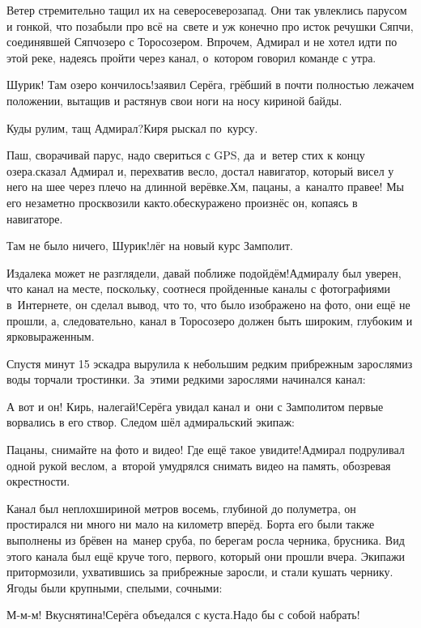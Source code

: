 Ветер стремительно тащил их на северо\sdash северо\sdash запад. Они так увлеклись парусом и гонкой, что позабыли про всё на~свете и уж конечно про исток речушки Сяпчи, соединявшей Сяпчозеро с Торосозером. Впрочем, Адмирал и не хотел идти по этой реке, надеясь пройти через канал, о~котором говорил команде с утра.

\diagdash Шурик! Там озеро кончилось!\mdash заявил Серёга, грёбший в почти полностью лежачем положении, вытащив и растянув свои ноги на носу кириной байды.

\diagdash Куды рулим, тащ Адмирал?\mdash Киря рыскал по~курсу.

\diagdash Паш, сворачивай парус, надо свериться с GPS, да~и~ветер стих к концу озера.\mdash сказал Адмирал и, перехватив весло, достал навигатор, который висел у него на шее через плечо на длинной верёвке.\mdash Хм, пацаны, а~канал\sdash то правее! Мы его незаметно просквозили как\sdash то.\mdash обескуражено произнёс он, копаясь в навигаторе.

\diagdash Там не было ничего, Шурик!\mdash лёг на новый курс Замполит.

\diagdash Издалека может не разглядели, давай поближе подойдём!\mdash Адмиралу был уверен, что канал на месте, поскольку, соотнеся пройденные каналы с фотографиями в~Интернете, он сделал вывод, что то, что было изображено на фото, они ещё не прошли, а, следовательно, канал в Торосозеро должен быть широким, глубоким и ярковыраженным. 

Спустя минут 15 эскадра вырулила к небольшим редким прибрежным зарослям\mdash из воды торчали тростинки. За~этими редкими зарослями начинался канал:

\diagdash А вот и он! Кирь, налегай!\mdash Серёга увидал канал и~они с Замполитом первые ворвались в его створ. Следом шёл адмиральский экипаж:

\diagdash Пацаны, снимайте на фото и видео! Где ещё такое увидите!\mdash Адмирал подруливал одной рукой веслом, а~второй умудрялся снимать видео на память, обозревая окрестности.

Канал был неплох\mdash шириной метров восемь, глубиной до полуметра, он простирался ни много ни мало на километр вперёд. Борта его были также выполнены из брёвен на~манер сруба, по берегам росла черника, брусника. Вид этого канала был ещё круче того, первого, который они прошли вчера. Экипажи притормозили, ухватившись за прибрежные заросли, и стали кушать чернику. Ягоды были крупными, спелыми, сочными:

\diagdash М-м-м! Вкуснятина!\mdash Серёга объедался с куста.\mdash Надо бы с собой набрать!

